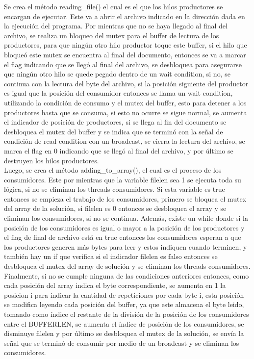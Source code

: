 \documentclass[12pt, article, natbib]{IEEEtran}
\begin{document}
Se crea el método reading\_file() el cual es el que los hilos productores se encargan de ejecutar. Este va a abrir el archivo indicado en la dirección dada en la ejecución del programa.\cite{chanilastnam_2015_c} \cite{cppreferencecom_2021_fread} \cite{kerrisk_2010_fseek3} Por mientras que no se haya llegado al final del archivo, se realiza un bloqueo del mutex para el buffer de lectura de los productores, para que ningún otro hilo productor toque este buffer, si el hilo que bloqueó este mutex se encuentra al final del documento, entonces se va a marcar el flag indicando que se llegó al final del archivo, se desbloquea para asegurarse que ningún otro hilo se quede pegado dentro de un wait condition, si no, se continua con la lectura del byte del archivo, si la posición siguiente del productor es igual que la posición del consumidor entonces se llama un wait condition, utilizando la condición de consumo y el mutex del buffer, esto para detener a los productores hasta que se consuma, si esto no ocurre se sigue normal, se aumenta el indicador de posición de productores, si se llega al fin del documento se desbloquea el mutex del buffer y se indica que se terminó con la señal de condición de read condition con un broadcast, se cierra la lectura del archivo, se marca el flag en 0 indicando que se llegó al final del archivo,  y por último se destruyen los hilos productores.\cite{kerrisk_2010_pthread_exit3} \\

Luego, se crea el método adding\_to\_array(), el cual es el proceso de los consumidores. Este por mientras que la variable filelen sea 1 se ejecuta toda su lógica, si no se eliminan los threads consumidores. Si esta variable es true entonces se empieza el trabajo de los consumidores, primero se bloquea el mutex del array de la solución, si filelen es 0 entonces se desbloquea el array y se eliminan los consumidores, si no se continua. Además, existe un while donde si la posición de los consumidores es igual o mayor a la posición de los productores y el flag de final de archivo está en true entonces los consumidores esperan a que los productores generen más bytes para leer y estos indiquen cuando terminen, y también hay un if que verifica si el indicador filelen es falso entonces se desbloquea el mutex del array de solución y se eliminan los threads consumidores. Finalmente, si no se cumple ninguna de las condiciones anteriores entonces, como cada posición del array indica el byte correspondiente, se aumenta en 1 la posicion i para indicar la cantidad de repeticiones por cada byte i, esta posición se modifica leyendo cada posición del buffer, ya que este almacena el byte leido, tomando como índice el restante de la división de la posición de los consumidores entre el BUFFERLEN, se aumenta el índice de posición de los consumidores, se disminuye filelen y por último se desbloquea el mutex de la solución, se envía la señal que se terminó de consumir por medio de un broadcast y se eliminan los consumidores.\\
\end{document}
